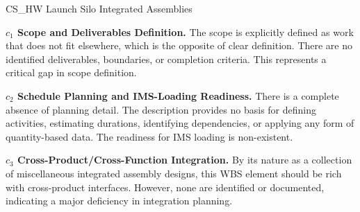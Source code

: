 %
\begin{frame}{CS\_HW Launch Silo Integrated Assemblies}
\begin{minipage}{0.90\textwidth}
\raggedright
\fontsize{8}{9.5}\selectfont
\textbf{\(c_1\) Scope and Deliverables Definition.}
The scope is explicitly defined as work that does not fit elsewhere, which is the opposite of clear definition. There are no identified deliverables, boundaries, or completion criteria. This represents a critical gap in scope definition.\par\vspace{0.6em}
\textbf{\(c_2\) Schedule Planning and IMS-Loading Readiness.}
There is a complete absence of planning detail. The description provides no basis for defining activities, estimating durations, identifying dependencies, or applying any form of quantity-based data. The readiness for IMS loading is non-existent.\par\vspace{0.6em}
\textbf{\(c_3\) Cross-Product/Cross-Function Integration.}
By its nature as a collection of miscellaneous integrated assembly designs, this WBS element should be rich with cross-product interfaces. However, none are identified or documented, indicating a major deficiency in integration planning.\par\vspace{0.6em}
\end{minipage}
\end{frame}

\endinput
